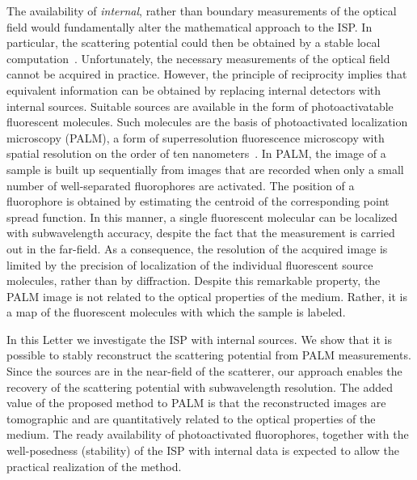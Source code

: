 \documentclass[prl,twocolumn]{revtex4-1}
\begin{document}
The availability of \emph{internal}, rather than boundary measurements of the optical field would fundamentally alter the mathematical approach to the ISP. In particular, the scattering potential could then be obtained by a stable local computation~\cite{remark}. Unfortunately, the necessary measurements of the optical field cannot be acquired in practice. However, the principle of reciprocity implies that equivalent information can be obtained by replacing internal detectors with internal sources. Suitable sources are available in the form of photoactivatable fluorescent molecules. Such molecules are the basis of photoactivated localization microscopy (PALM), a form of superresolution fluorescence microscopy with spatial resolution on the order of ten nanometers~\cite{Betzig1642,Patterson,Roadmap}. In PALM, the image of a sample is built up sequentially from images that are recorded when only a small number of well-separated fluorophores are activated. The position of a fluorophore is obtained by estimating the centroid of the corresponding point spread function. In this manner, a single fluorescent molecular can be localized with subwavelength accuracy, despite the fact that the measurement is carried out in the far-field. As a consequence, the resolution of the acquired image is limited by the precision of localization of the individual fluorescent source molecules, rather than by diffraction. Despite this remarkable property, the PALM image is not related to the optical properties of the medium. Rather, it is a map of the fluorescent molecules with which the sample is labeled.

In this Letter we investigate the ISP with internal sources. We show that it is possible to stably reconstruct the scattering potential from PALM measurements.  Since the sources are in the near-field of the scatterer, our approach enables the recovery of the scattering potential with subwavelength resolution. 
The added value of the proposed method to PALM is that the reconstructed images are tomographic and are quantitatively related to the optical properties of the medium. The ready availability of photoactivated fluorophores, together with the well-posedness (stability) of the ISP with internal data is expected to allow the practical realization of the method.
\end{document}

